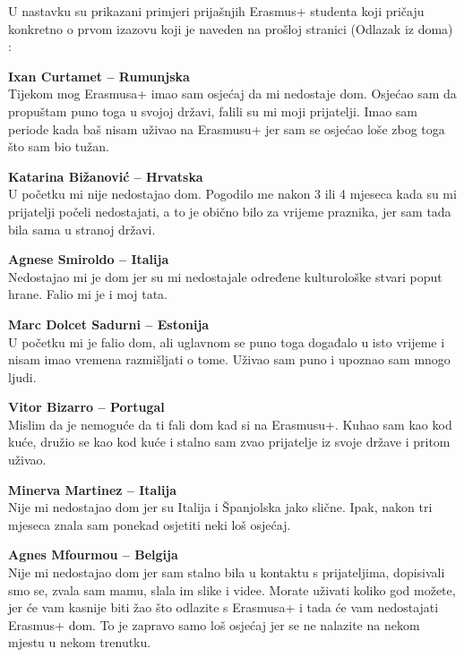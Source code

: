 \documentclass[]{foi}
\begin{document}
U nastavku su prikazani primjeri prijašnjih Erasmus+ studenta koji pričaju konkretno o prvom izazovu koji je naveden na prošloj stranici (Odlazak iz doma) \cite{erasmus_homesick_video_2024}:

\textbf{Ixan Curtamet – Rumunjska} \\
Tijekom mog Erasmusa+ imao sam osjećaj da mi nedostaje dom. Osjećao sam da propuštam puno toga u svojoj državi, falili su mi moji prijatelji. Imao sam periode kada baš nisam uživao na Erasmusu+ 
jer sam se osjećao loše zbog toga što sam bio tužan.

\vspace{1em}

\textbf{Katarina Bižanović – Hrvatska} \\
U početku mi nije nedostajao dom. Pogodilo me nakon 3 ili 4 mjeseca kada su mi prijatelji počeli nedostajati, a to je obično bilo za vrijeme praznika, jer sam tada bila sama u stranoj državi.

\vspace{1em}

\textbf{Agnese Smiroldo – Italija} \\
Nedostajao mi je dom jer su mi nedostajale određene kulturološke stvari poput hrane. Falio mi je i moj tata.

\vspace{1em}

\textbf{Marc Dolcet Sadurni – Estonija} \\
U početku mi je falio dom, ali uglavnom se puno toga događalo u isto vrijeme i nisam imao vremena razmišljati o tome. Uživao sam puno i upoznao sam mnogo ljudi.

\vspace{1em}

\textbf{Vitor Bizarro – Portugal} \\
Mislim da je nemoguće da ti fali dom kad si na Erasmusu+. Kuhao sam kao kod kuće, družio se kao kod kuće i stalno sam zvao prijatelje iz svoje države i pritom uživao.

\vspace{1em}

\textbf{Minerva Martinez – Italija} \\
Nije mi nedostajao dom jer su Italija i Španjolska jako slične. Ipak, nakon tri mjeseca znala sam ponekad osjetiti neki loš osjećaj.

\vspace{1em}

\textbf{Agnes Mfourmou – Belgija} \\
Nije mi nedostajao dom jer sam stalno bila u kontaktu s prijateljima, dopisivali smo se, zvala sam mamu, slala im slike i videe. Morate uživati koliko god možete, 
jer će vam kasnije biti žao što odlazite s Erasmusa+ i tada će vam nedostajati Erasmus+ dom. To je zapravo samo loš osjećaj jer se ne nalazite na nekom mjestu u nekom trenutku.
\end{document}
